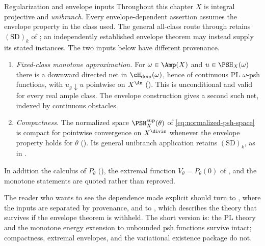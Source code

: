 \begin{important}{Regularization and envelope inputs}
\label{imp:ch46-envelope-imported}
Throughout this chapter $X$ is integral projective and \emph{unibranch}.
Every envelope-dependent assertion assumes the envelope property in the
class used. The general all-class route through 
retains $\mathrm{(SD)}_k$ of ; an independently
established envelope theorem may instead supply its stated instances.
The two inputs below have different provenance.
\begin{enumerate}
\item\label{itm:ch46-imp:regularization}
      \emph{Fixed-class monotone approximation.}  For
      $\omega\in\Amp(X)$ and $u\in\PSH_X(\omega)$ there is a downward
      directed net in $\cH_{\mathrm{dom}}(\omega)$, hence of continuous
      PL $\omega$-psh functions, with $u_g\downarrow u$ pointwise on
      $X^{\An}$ ().  This is
      unconditional and valid for every real ample class.  The envelope
      construction  gives a second
      such net, indexed by continuous obstacles.
\item\label{itm:ch46-imp:compactness}
      \emph{Compactness.}  The normalized space
      $\PSH^{\sup}_X(\theta)$ of \eqref{eq:normalized-psh-space} is
      compact for pointwise convergence on $X^{\divis}$ whenever the
      envelope property holds for $\theta$
      (). Its general unibranch application
      retains $\mathrm{(SD)}_k$, as in
      .
\end{enumerate}
In addition the calculus of $P_\theta$
(), the
extremal function $V_\theta=P_\theta(0)$ of , and
the monotone statements
are quoted rather than reproved.
\end{important}

The reader who wants to see the dependence made explicit should turn to
, where the inputs are separated by
provenance, and to , which
describes the theory that survives if the envelope theorem is withheld.
The short version is: the PL theory and the monotone energy extension to
unbounded psh functions survive intact; compactness, extremal envelopes,
and the variational existence package do not.

